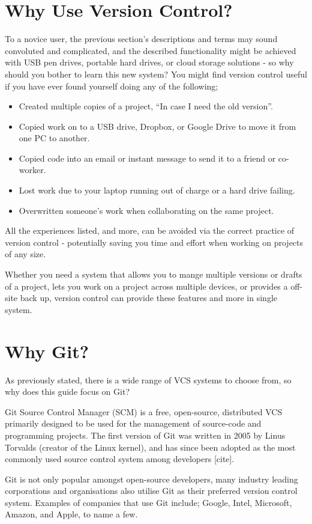 \documentclass[11pt, a4paper, draft, titlepage]{article}
\begin{document}
\section{Why Use Version Control?} 
To a novice user, the previous section's descriptions and terms may sound
convoluted and complicated, and the described functionality might be achieved
with USB pen drives, portable hard drives, or cloud storage solutions - so why
should you bother to learn this new system?  
You might find version control useful if you have ever found yourself doing
any of the following;
\begin{itemize}
\item Created multiple copies of a project, ``In case I need the old version''.
\item Copied work on to a USB drive, Dropbox, or Google Drive to move it from
one PC to another.
\item Copied code into an email or instant message to send it to a friend or
co-worker.
\item Lost work due to your laptop running out of charge or a hard drive
failing.
\item Overwritten someone's work when collaborating on the same project.
\end{itemize}

All the experiences listed, and more, can be avoided via the correct practice
of version control - potentially saving you time and effort when working on
projects of any size.

Whether you need a system that allows you to mange multiple versions or drafts
of a project, lets you work on a project across multiple devices, or provides a
off-site back up, version control can provide these features and more in
single system.


\section{Why Git?} 
As previously stated, there is a wide range of VCS systems to choose from, so
why does this guide focus on Git?


Git Source Control Manager (SCM) is a free, open-source, distributed VCS
primarily designed to be used for the management of source-code and
programming projects.  The first version of Git was written in 2005 by Linus
Torvalds (creator of the Linux kernel), and has since been adopted as the most
commonly used source control system among developers [cite].

Git is not only popular amongst open-source developers, many industry leading
corporations and organisations also utilise Git as their preferred version
control system.  Examples of companies that use Git include; Google, Intel,
Microsoft, Amazon, and Apple, to name a few.
\end{document}
